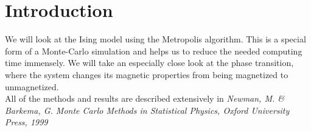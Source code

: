 \section{Introduction}

We will look at the Ising model using the Metropolis algorithm. This is a special form of a Monte-Carlo simulation and helps us to reduce the needed computing time immensely. We will take an especially close look at the phase transition, where the system changes its magnetic properties from being magnetized to unmagnetized.\\
All of the methods and results are described extensively in \emph{Newman, M. \& Barkema, G. Monte Carlo Methods in Statistical Physics, Oxford University Press, 1999}
